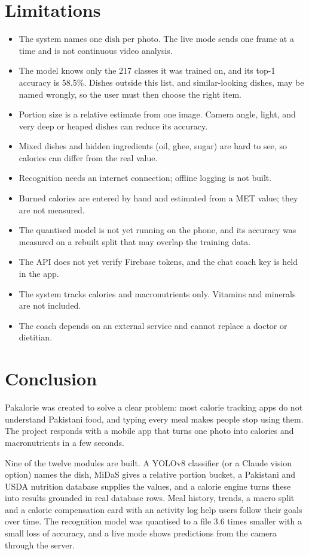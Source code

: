 \section{Limitations}
\begin{itemize}[noitemsep]
  \item The system names one dish per photo. The live mode sends one frame at a time and is not continuous
        video analysis.
  \item The model knows only the 217 classes it was trained on, and its top-1 accuracy is 58.5\%. Dishes outside this
        list, and similar-looking dishes, may be named wrongly, so the user must then choose the right item.
  \item Portion size is a relative estimate from one image. Camera angle, light, and very deep or heaped dishes can
        reduce its accuracy.
  \item Mixed dishes and hidden ingredients (oil, ghee, sugar) are hard to see, so calories can differ from the
        real value.
  \item Recognition needs an internet connection; offline logging is not built.
  \item Burned calories are entered by hand and estimated from a MET value; they are not measured.
  \item The quantised model is not yet running on the phone, and its accuracy was measured on a rebuilt split that may
        overlap the training data.
  \item The API does not yet verify Firebase tokens, and the chat coach key is held in the app.
  \item The system tracks calories and macronutrients only. Vitamins and minerals are not included.
  \item The coach depends on an external service and cannot replace a doctor or dietitian.
\end{itemize}

\section{Conclusion}
Pakalorie was created to solve a clear problem: most calorie tracking apps do not understand Pakistani food, and
typing every meal makes people stop using them. The project responds with a mobile app that turns one photo into
calories and macronutrients in a few seconds.

Nine of the twelve modules are built. A YOLOv8 classifier (or a Claude vision option) names the dish, MiDaS gives a
relative portion bucket, a Pakistani and USDA nutrition database supplies the values, and a calorie engine turns these
into results grounded in real database rows. Meal history, trends, a macro split and a calorie compensation card with
an activity log help users follow their goals over time. The recognition model was quantised to a file 3.6 times
smaller with a small loss of accuracy, and a live mode shows predictions from the camera through the server.

